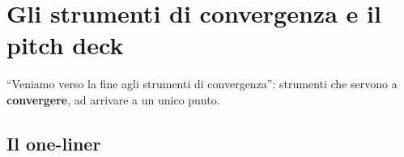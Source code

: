 \section{Gli strumenti di convergenza e il pitch deck}
\label{a5:sec:convergenza}

``Veniamo verso la fine agli strumenti di convergenza'': strumenti che servono a
\textbf{convergere}, ad arrivare a un unico punto.

\subsection{Il one-liner}



